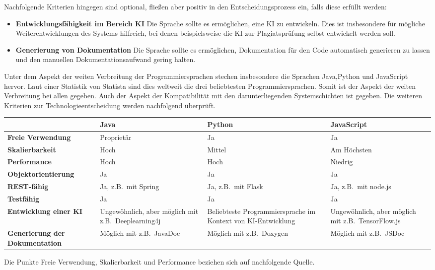 Nachfolgende Kriterien hingegen sind optional, fließen aber
positiv in den Entscheidungsprozess ein, falls diese erfüllt werden:
\begin{itemize}
    \item \textbf{Entwicklungsfähigkeit im Bereich KI} Die Sprache sollte es ermöglichen, eine KI zu entwickeln.
            Dies ist insbesondere für mögliche Weiterentwicklungen des Systems hilfreich,
            bei denen beispielsweise die KI zur Plagiatsprüfung selbst entwickelt werden soll.
    \item \textbf{Generierung von Dokumentation} Die Sprache sollte es ermöglichen, Dokumentation für den Code
            automatisch generieren zu lassen und den manuellen Dokumentationsaufwand gering halten.
\end{itemize}
Unter dem Aspekt der weiten Verbreitung der Programmiersprachen
stechen insbesondere die Sprachen Java,Python und JavaScript hervor.
Laut einer Statistik von Statista sind dies weltweit die drei beliebtesten Programmiersprachen\autocite{programmiersprachen}.
Somit ist der Aspekt der weiten Verbreitung bei allen gegeben.
Auch der Aspekt der Kompatibilität mit den darunterliegenden Systemschichten ist gegeben.
Die weiteren Kriterien zur Technologieentscheidung werden nachfolgend überprüft.

\begin{tabularx}{\textwidth}{l|X|X|X}
    & \textbf{Java} & \textbf{Python} & \textbf{JavaScript} \\ \hline
    \textbf{Freie Verwendung} & \cellcolor{red!30} Proprietär & \cellcolor{green!30}Ja & \cellcolor{green!30}Ja \\ \hline
    \textbf{Skalierbarkeit} & \cellcolor{green!30}Hoch & \cellcolor{orange!30}Mittel & \cellcolor{green!30}Am Höchsten \\ \hline
    \textbf{Performance} & \cellcolor{green!30}Hoch & \cellcolor{green!30}Hoch & \cellcolor{red!30}Niedrig \\ \hline
    \textbf{Objektorientierung} & \cellcolor{green!30}Ja & \cellcolor{green!30}Ja & \cellcolor{green!30}Ja \\ \hline
    \textbf{REST-fähig} & \cellcolor{green!30}Ja, z.B.\ mit Spring & \cellcolor{green!30}Ja, z.B.\ mit Flask & \cellcolor{green!30}Ja, z.B.\ mit node.js \\ \hline
    \textbf{Testfähig} & \cellcolor{green!30}Ja & \cellcolor{green!30}Ja & \cellcolor{green!30}Ja \\ \hline
    \textbf{Entwicklung einer KI} & \cellcolor{orange!30}Ungewöhnlich, aber möglich mit z.B.\ Deeplearning4j & \cellcolor{green!30}Beliebteste Programmiersprache im Kontext von KI-Entwicklung & \cellcolor{orange!30}Ungewöhnlich, aber möglich mit z.B.\ TensorFlow.js \\ \hline
    \textbf{Generierung der Dokumentation} & \cellcolor{green!30}Möglich mit z.B.\ JavaDoc & \cellcolor{green!30}Möglich mit z.B.\ Doxygen & \cellcolor{green!30}Möglich mit z.B.\ JSDoc \\
\end{tabularx}
Die Punkte Freie Verwendung, Skalierbarkeit und Performance beziehen sich auf nachfolgende Quelle\autocite{nodejavapython}.

